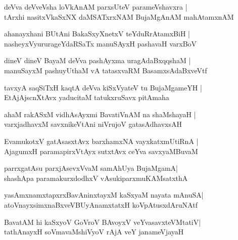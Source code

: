 \begin{shloka}
deVva deVveVsha loVkAnAM parxsUteV parameVshavxra |\\ tArxhi nasitxVkaSxNX daMSATxrxNAM BujaMgAnAM mahAtamxnAM 
\end{shloka}

\begin{shloka}
ahanayxhani BUtAni BakaSxyXnetxV teYduRrAtamxBiH |\\ nasheyxVyururageYdaRSaTx manuSAyxH pashavaH varxBoV
\end{shloka}

\begin{shloka}
dineV dineV BayaM deVva pashAyxma uragAdaBxqqshaM |\\
manuSayxM pashuyUthaM vA tatasxvaRM BasamxsAdaBxveVtf
\end{shloka}

\begin{shloka}
tavxyA saqSiTxH kaqtA deVva kiSxVyateV tu BujaMgameYH |\\ EtAjAjscnXtAvx yaducitaM tatukxruSavx pitAmaha
\end{shloka}

\begin{shloka}
ahaM rakASxM vidhAsAyxmi BavatiVnAM na shaMshayaH |\\
varxjadhavxM savxnikeVtAni niVrujoV gatasAdhavxsAH 
\end{shloka}

\begin{shloka}
EvamukotxV gatAsasxtAvx barxhamxNA vayxkatxmUtiRnA |\\ AjagumxH paramapirxVtAyx sutxtAvx ceYva savxyaMBuvaM
\end{shloka}

\begin{shloka}
parrxgatAsu parxjAsevxVvaM samAhUya BujaMgamA\R |\\ shashApa paramakurxdodhxV vAsukiparxmuKAMsatxthA
\end{shloka}

\begin{shloka}
yasAmxnamxtapxrxBavAninxtayxM kaSxyaM nayata mAnuSA\R |\\ atoVnayxsimxnaBxveVBUyAnamxtatxH koVpAtusxdAruNAtf
\end{shloka}

\begin{shloka}
BavatAM hi kaSxyoV GoVroV BAvoyxV veYvasavxteVMtatiV|\\ tathAnayxH soVmavaMshiVyoV rAjA veY janameVjayaH 
\end{shloka}

